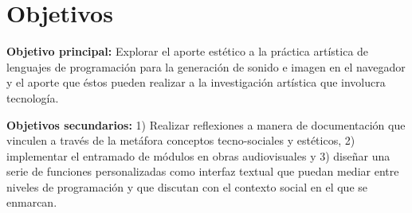 \section*{Objetivos}


\textbf{Objetivo principal:} Explorar el aporte estético a la práctica artística de lenguajes de programación para la generación de sonido e imagen en el navegador y el aporte que éstos pueden realizar a la investigación artística que involucra tecnología.

\textbf{Objetivos secundarios:} 1) Realizar reflexiones a manera de documentación que vinculen a través de la metáfora conceptos tecno-sociales y estéticos, 2) implementar el entramado de módulos en obras audiovisuales y 3) diseñar una serie de funciones personalizadas como interfaz textual que puedan mediar entre niveles de programación y que discutan con el contexto social en el que se enmarcan.








